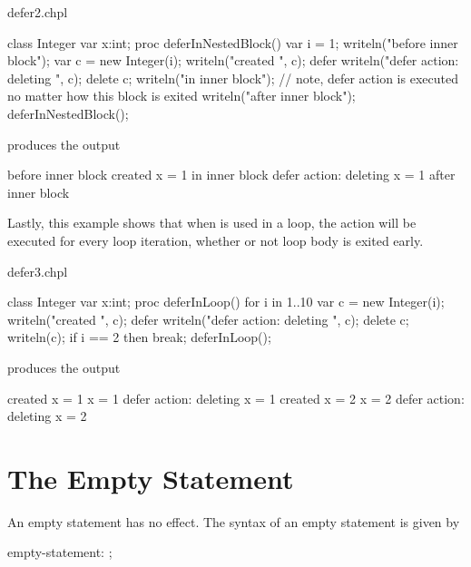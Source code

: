 \begin{chapelexample}{defer2.chpl}
\begin{chapel}
class Integer {
  var x:int;
}
proc deferInNestedBlock() {
  var i = 1;
  writeln("before inner block");
  {
    var c = new Integer(i);
    writeln("created ", c);
    defer {
      writeln("defer action: deleting ", c);
      delete c;
    }
    writeln("in inner block");
    // note, defer action is executed no matter how this block is exited
  }
  writeln("after inner block");
}
deferInNestedBlock();
\end{chapel}
produces the output
\begin{chapelprintoutput}{}
before inner block
created {x = 1}
in inner block
defer action: deleting {x = 1}
after inner block
\end{chapelprintoutput}
\end{chapelexample}

Lastly, this example shows that when  is used in a loop, the
action will be executed for every loop iteration, whether or not loop
body is exited early.

\begin{chapelexample}{defer3.chpl}
\begin{chapel}
class Integer {
  var x:int;
}
proc deferInLoop() {
  for i in 1..10 {
    var c = new Integer(i);
    writeln("created ", c);
    defer {
      writeln("defer action: deleting ", c);
      delete c;
    }
    writeln(c);
    if i == 2 then
      break;
  }
}
deferInLoop();
\end{chapel}
produces the output
\begin{chapelprintoutput}{}
created {x = 1}
{x = 1}
defer action: deleting {x = 1}
created {x = 2}
{x = 2}
defer action: deleting {x = 2}
\end{chapelprintoutput}
\end{chapelexample}


\section{The Empty Statement}
\label{The_Empty_Statement}

An empty statement has no effect.  The syntax of an empty statement is
given by
\begin{syntax}
empty-statement:
  ;
\end{syntax}
